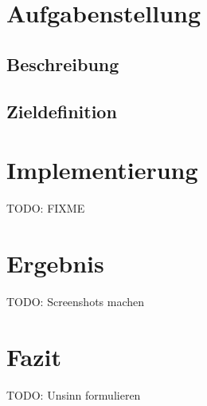 



\setcounter{secnumdepth}{3}
\setcounter{tocdepth}{2}

\pagestyle{empty}


\tableofcontents
\setcounter{page}{1}

\pagestyle{scrheadings}

\newpage

\section{Aufgabenstellung}

\subsection{Beschreibung}

\subsection{Zieldefinition}

\section{Implementierung}
TODO: FIXME

\section{Ergebnis}
TODO: Screenshots machen

\section{Fazit}
TODO: Unsinn formulieren


\appendix


\newpage

